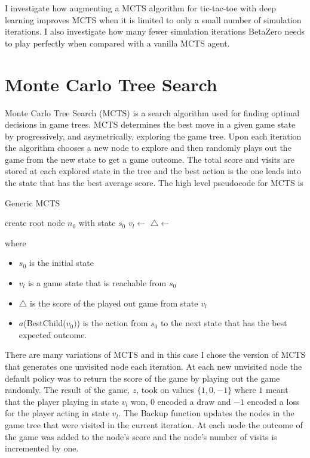 \documentclass[letterpaper]{article} %
\begin{document}
  I investigate how augmenting a MCTS
  algorithm for tic-tac-toe with deep learning improves MCTS when it is limited
  to only a small number of simulation iterations. I also investigate how many
  fewer simulation iterations BetaZero needs to play perfectly when compared
  with a vanilla MCTS agent.

\section{Monte Carlo Tree Search}
  Monte Carlo Tree Search (MCTS) is a search algorithm used for finding optimal
  decisions in game trees. MCTS determines the best move in a given game state
  by progressively, and asymetrically, exploring the game tree. Upon each
  iteration the algorithm chooses a new node to explore and then randomly plays
  out the game from the new state to get a game outcome.\cite{Browne12asurvey}
  The total score and visits are stored at each explored  state in the tree and
  the best action is the one leads into the state that has the best average
  score. The high level pseudocode for MCTS is
  \begin{algorithm}
  \caption{Generic MCTS}
  \begin{algorithmic}[1]

    \State create root node $n_0$ with state $s_0$
      \State $v_l \gets $
      \State $\triangle \gets$ 
      \State {}
    \EndWhile
    \State \Return {}
  \EndFunction
  \end{algorithmic}
  \end{algorithm}

  \noindent
  where 
  \begin{itemize}
    \item $s_0$ is the initial state
    \item $v_l$ is a game state that is reachable from $s_0$
    \item $\triangle$ is the score of the played out game from state $v_l$
    \item $a$(BestChild($v_0)$) is the action from $s_0$ to the next state that
      has the best expected outcome.
  \end{itemize}

  There are  many variations of MCTS and in this case I chose the version of
  MCTS that generates one unvisited node each iteration. At each new unvisited
  node the default policy was to return the score of the game by playing out the
  game randomly. The result of the game, $z$, took on values $\{1, 0, -1\}$ where
  $1$ meant that the player playing in state $v_l$ won, $0$ encoded a draw and
  $-1$ encoded a loss for the player acting in state $v_l$. The Backup function
  updates the nodes in the game tree that were visited in the current iteration.
  At each node the outcome of the game was added to the node's score and the
  node's number of visits is incremented by one.
\end{document}
